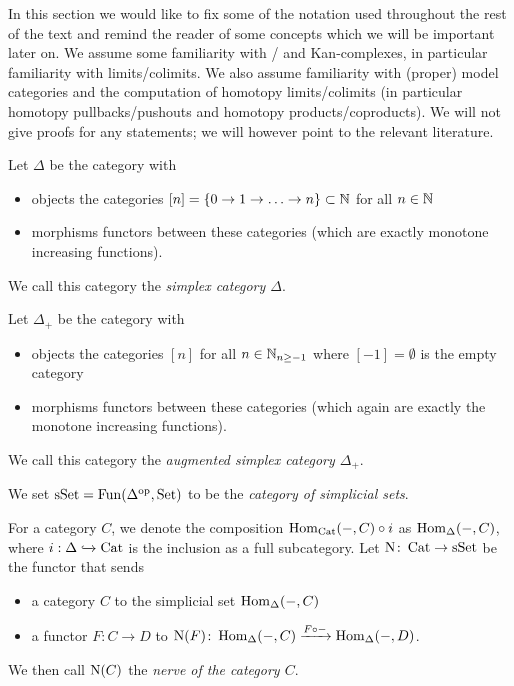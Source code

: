 In this section we would like to fix some of the notation used throughout the rest of the text and remind the reader of some concepts which we will be important later on.
We assume some familiarity with \inftycats/ and Kan-complexes, in particular familiarity with limits/colimits.
We also assume familiarity with (proper) model categories and the computation of homotopy limits/colimits (in particular homotopy pullbacks/pushouts and homotopy products/coproducts).
We will not give proofs for any statements; we will however point to the relevant literature.
\begin{definition}
    Let $\Delta$ be the category with
    \begin{itemize}
        \item objects the categories $[n]=\{0\to1\to\ldots\to n\}\subset\mathbb{N}$ for all $n\in\mathbb{N}$
        \item morphisms functors between these categories (which are exactly monotone increasing functions).
    \end{itemize}
    We call this category the \emph{simplex category $\Delta$}.
\end{definition}
\begin{definition}
    Let $\Delta_+$ be the category with
    \begin{itemize}
        \item objects the categories $[n]$ for all $n\in\mathbb{N}_{n\geq-1}$ where $[-1]=\emptyset$ is the empty category
        \item morphisms functors between these categories (which again are exactly the monotone increasing functions).
    \end{itemize}
    We call this category the \emph{augmented simplex category $\Delta_+$}.
\end{definition}
\begin{definition}
    We set $\operatorname{sSet}=\operatorname{Fun}(\Delta^{\operatorname{op}},\operatorname{Set})$ to be the \emph{category of simplicial sets}.
\end{definition}
\begin{definition}
    For a category $C$, we denote the composition $\operatorname{Hom}_{\operatorname{Cat}}(-,C)\circ i$ as $\operatorname{Hom}_{\Delta}(-,C)$, where $i:\Delta\xhookrightarrow{}\operatorname{Cat}$ is the inclusion as a full subcategory.
    Let $\operatorname{N}\colon\operatorname{Cat}\to\operatorname{sSet}$ be the functor that sends
    \begin{itemize}
        \item a category $C$ to the simplicial set $\operatorname{Hom}_{\Delta}(-,C)$
        \item a functor $F:C\to D$ to $\operatorname{N}(F)\colon\operatorname{Hom}_{\Delta}(-,C)\xrightarrow{F\circ -}\operatorname{Hom}_{\Delta}(-,D)$\;.
    \end{itemize}
    We then call $\operatorname{N}(C)$ the \emph{nerve of the category $C$}.
\end{definition}
